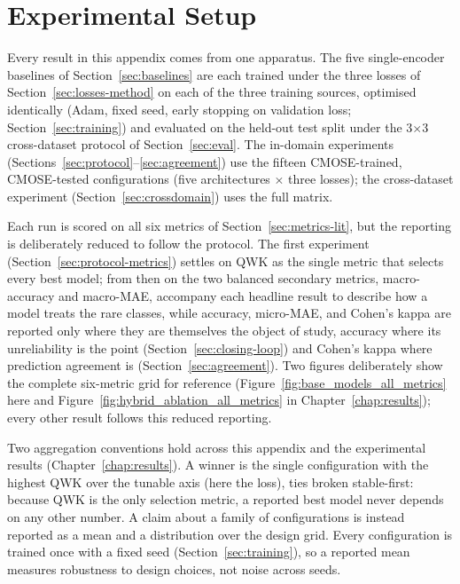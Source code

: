 \documentclass[../main.tex]{subfiles}
\begin{document}
\FloatBarrier
\section{Experimental Setup}
\label{sec:setup-baseline}

Every result in this appendix comes from one apparatus. The five single-encoder baselines of Section~\ref{sec:baselines} are each trained under the three losses of Section~\ref{sec:losses-method} on each of the three training sources, optimised identically (Adam, fixed seed, early stopping on validation loss; Section~\ref{sec:training}) and evaluated on the held-out test split under the 3$\times$3 cross-dataset protocol of Section~\ref{sec:eval}. The in-domain experiments (Sections~\ref{sec:protocol}--\ref{sec:agreement}) use the fifteen CMOSE-trained, CMOSE-tested configurations (five architectures $\times$ three losses); the cross-dataset experiment (Section~\ref{sec:crossdomain}) uses the full matrix.

Each run is scored on all six metrics of Section~\ref{sec:metrics-lit}, but the reporting is deliberately reduced to follow the protocol. The first experiment (Section~\ref{sec:protocol-metrics}) settles on QWK as the single metric that selects every best model; from then on the two balanced secondary metrics, macro-accuracy and macro-MAE, accompany each headline result to describe how a model treats the rare classes, while accuracy, micro-MAE, and Cohen's kappa are reported only where they are themselves the object of study, accuracy where its unreliability is the point (Section~\ref{sec:closing-loop}) and Cohen's kappa where prediction agreement is (Section~\ref{sec:agreement}). Two figures deliberately show the complete six-metric grid for reference (Figure~\ref{fig:base_models_all_metrics} here and Figure~\ref{fig:hybrid_ablation_all_metrics} in Chapter~\ref{chap:results}); every other result follows this reduced reporting.

Two aggregation conventions hold across this appendix and the experimental results (Chapter~\ref{chap:results}). A winner is the single configuration with the highest QWK over the tunable axis (here the loss), ties broken stable-first: because QWK is the only selection metric, a reported best model never depends on any other number. A claim about a family of configurations is instead reported as a mean and a distribution over the design grid. Every configuration is trained once with a fixed seed (Section~\ref{sec:training}), so a reported mean measures robustness to design choices, not noise across seeds.
\end{document}
